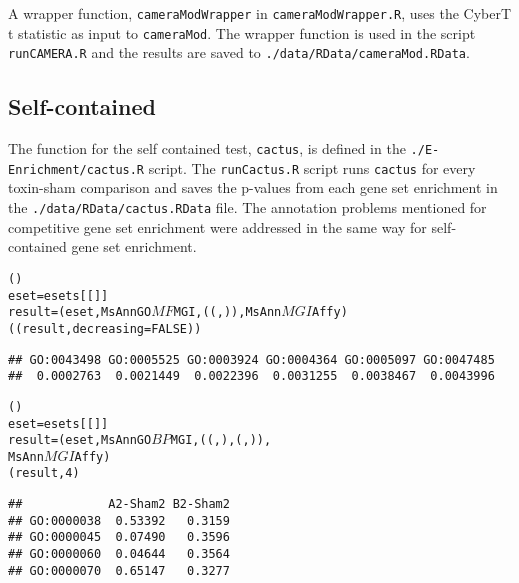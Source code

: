 A wrapper function, \texttt{cameraModWrapper} in \texttt{cameraModWrapper.R}, 
uses the CyberT t statistic as input to \texttt{cameraMod}. The wrapper function
is used in the script \texttt{runCAMERA.R} and the results are saved to
\texttt{./data/RData/cameraMod.RData}.

\subsection{Self-contained}

The function for the self contained test, \texttt{cactus}, is defined in the
\texttt{./E-Enrichment/cactus.R} script. The \texttt{runCactus.R} script
runs \texttt{cactus} for every toxin-sham comparison and saves the p-values
from each gene set enrichment in the \texttt{./data/RData/cactus.RData} file.
The annotation problems mentioned for competitive gene set enrichment
were addressed in the same way for self-contained gene set enrichment.

\singlespacing
\begin{knitrout}
\color{fgcolor}\begin{kframe}
\begin{alltt}
()
eset = esets[[]]
result = (eset, MsAnnGO$MF$MGI, ((, )), MsAnn$MGI$Affy)
((result, decreasing = FALSE))
\end{alltt}
\begin{verbatim}
## GO:0043498 GO:0005525 GO:0003924 GO:0004364 GO:0005097 GO:0047485 
##  0.0002763  0.0021449  0.0022396  0.0031255  0.0038467  0.0043996
\end{verbatim}
\begin{alltt}
\doublespacing

()
eset = esets[[]]
result = (eset, MsAnnGO$BP$MGI, ((, ), (, )), 
    MsAnn$MGI$Affy)
(result, 4)
\end{alltt}
\begin{verbatim}
##            A2-Sham2 B2-Sham2
## GO:0000038  0.53392   0.3159
## GO:0000045  0.07490   0.3596
## GO:0000060  0.04644   0.3564
## GO:0000070  0.65147   0.3277
\end{verbatim}
\end{kframe}
\end{knitrout}
\doublespacing

